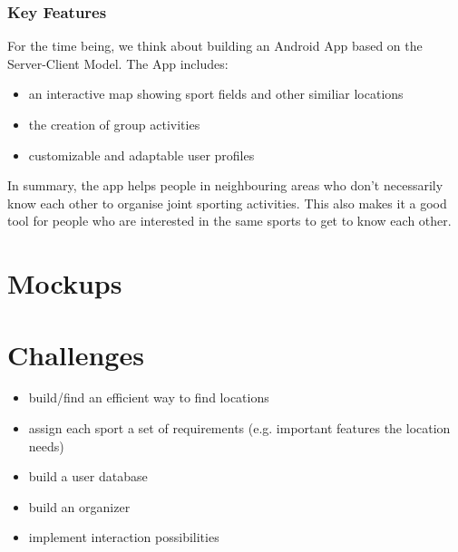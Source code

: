 \documentclass[aspectratio=169]{beamer}
\begin{document}
\begin{frame}
\frametitle{Key Features}
For the time being, we think about building an Android App based on the
Server-Client Model. The App includes:

\begin{itemize}
	\item an interactive map showing sport fields and other similiar locations
	\item the creation of group activities
	\item customizable and adaptable user profiles 
\end{itemize}
In summary, the app helps people in neighbouring areas who don’t necessarily
know each other to organise joint sporting activities. This also makes it a good tool
for people who are interested in the same sports to get to know each other.
\end{frame}


\section{Mockups}


\section{Challenges}
\begin{frame}
	\begin{itemize}
		\item build/find an efficient way to find locations
		\item assign each sport a set of requirements (e.g. important features the location needs)
		\item build a user database
		\item build an organizer 
		\item implement interaction possibilities
	\end{itemize}
\end{frame}
\end{document}
